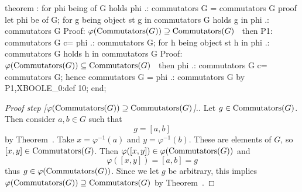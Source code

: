 \nwenddocs{}\endmoddef\nwstartdeflinemarkup{}\nwenddeflinemarkup
theorem :
  for phi being  of G
  holds phi .: commutators G = commutators G
proof
  let phi be  of G;
  for g being object
  st g in commutators G
  holds g in phi .: commutators G
  \LA{}Proof: $\varphi(\operatorname{Commutators}(G))\supseteq\operatorname{Commutators}(G)$~{\nwtagstyle{}}\RA{}
  then P1: commutators G c= phi .: commutators G;
  for h being object
  st h in phi .: commutators G
  holds h in commutators G
  \LA{}Proof: $\varphi(\operatorname{Commutators}(G))\subseteq\operatorname{Commutators}(G)$~{\nwtagstyle{}}\RA{}
  then phi .: commutators G c= commutators G;
  hence commutators G = phi .: commutators G by P1,XBOOLE_0:def 10;
end;
\eatline
{}\nwendcode{}\nwdocspar
\begin{proof}[{Proof step [$\varphi(\operatorname{Commutators}(G))\supseteq\operatorname{Commutators}(G)$]}.]
  Let $g\in\operatorname{Commutators}(G)$. Then consider $a,b\in G$ such that
  \begin{equation}
g = [a,b]
  \end{equation}
  by Theorem~. Take $x=\varphi^{-1}(a)$ and
  $y=\varphi^{-1}(b)$. These are elements of $G$, so $[x,y]\in\operatorname{Commutators}(G)$.
  Then $\varphi([x,y])\in\varphi(\operatorname{Commutators}(G))$ and
  \begin{equation}
\varphi([x,y])=[a,b]=g
  \end{equation}
  thus $g\in\varphi(\operatorname{Commutators}(G))$. Since we let $g$ be arbitrary,
  this implies $\varphi(\operatorname{Commutators}(G))\supseteq\operatorname{Commutators}(G)$ by Theorem~.
\end{proof}

